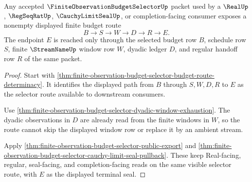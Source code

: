 
\begin{theorem}
\label{thm:finite-observation-budget-selector-terminal-budget-nonempty}
Any accepted $\FiniteObservationBudgetSelectorUp$ packet used by a $\RealUp$, $\RegSeqRatUp$, $\CauchyLimitSealUp$, or completion-facing consumer exposes a nonempty displayed finite budget route
$$
B \to S \to W \to D \to R \to E.
$$
The endpoint $E$ is reached only through the selected budget row $B$, schedule row $S$, finite $\StreamNameUp$ window row $W$, dyadic ledger $D$, and regular handoff row $R$ of the same packet.
\end{theorem}
\begin{proof}
Start with \autoref{thm:finite-observation-budget-selector-budget-route-determinacy}. It identifies the displayed path from $B$ through $S,W,D,R$ to $E$ as the selector route available to downstream consumers.

Use \autoref{thm:finite-observation-budget-selector-dyadic-window-exhaustion}. The dyadic observations in $D$ are already read from the finite windows in $W$, so the route cannot skip the displayed window row or replace it by an ambient stream.

Apply \autoref{thm:finite-observation-budget-selector-public-export} and \autoref{thm:finite-observation-budget-selector-cauchy-limit-seal-pullback}. These keep Real-facing, regular, seal-facing, and completion-facing reads on the same visible selector route, with $E$ as the displayed terminal seal.
\end{proof}

